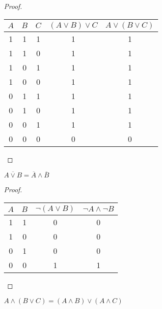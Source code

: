 \begin{proof}
	\hfill \break \break
	\begin{center}
		\begin{tabular}{ |c|c|c|c|c| } 
			\hline
			$A$ & $B$ & $C$ & $(A \lor B) \lor C$ & $A \lor (B \lor C)$ \\
			\hline 
			1 & 1 & 1 & 1 & 1 \\ 
			1 & 1 & 0 & 1 & 1 \\ 
			1 & 0 & 1 & 1 & 1 \\ 
			1 & 0 & 0 & 1 & 1 \\
			0 & 1 & 1 & 1 & 1 \\ 
			0 & 1 & 0 & 1 & 1 \\ 
			0 & 0 & 1 & 1 & 1 \\ 
			0 & 0 & 0 & 0 & 0 \\ 
			\hline
		\end{tabular}
	\end{center}
\end{proof}

\begin{theorem}
	$\overline{A \lor B} = \overline{A} \land \overline{B}$
\end{theorem}

\begin{proof}
	\hfill \break \break
	\begin{center}
		\begin{tabular}{ |c|c|c|c| } 
			\hline
			$A$ & $B$ & $\neg (A \lor B)$ & $\neg A \land \neg B$ \\
			\hline 
			1 & 1 & 0 & 0 \\ 
			1 & 0 & 0 & 0 \\
			0 & 1 & 0 & 0 \\ 
			0 & 0 & 1 & 1 \\  
			\hline
		\end{tabular}
	\end{center}
\end{proof}

\newpage

\begin{theorem}
	\hfill \break
	$A \land  (B \lor C) = (A \land B) \lor (A \land C)$
\end{theorem}


